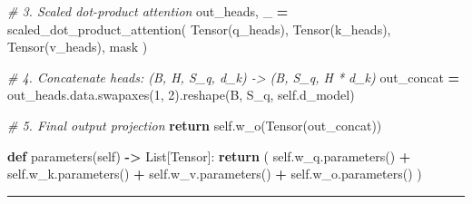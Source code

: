 \documentclass[
  letterpaper,
]{scrbook}
\newenvironment{Shaded}{\begin{snugshade}}{\end{snugshade}}
\newcommand{\CommentTok}[1]{\textcolor[rgb]{0.56,0.35,0.01}{\textit{#1}}}
\newcommand{\ControlFlowTok}[1]{\textcolor[rgb]{0.13,0.29,0.53}{\textbf{#1}}}
\newcommand{\DecValTok}[1]{\textcolor[rgb]{0.00,0.00,0.81}{#1}}
\newcommand{\KeywordTok}[1]{\textcolor[rgb]{0.13,0.29,0.53}{\textbf{#1}}}
\newcommand{\NormalTok}[1]{#1}
\newcommand{\OperatorTok}[1]{\textcolor[rgb]{0.81,0.36,0.00}{\textbf{#1}}}
\newcommand{\VariableTok}[1]{\textcolor[rgb]{0.00,0.00,0.00}{#1}}
\begin{document}
\begin{Shaded}
\begin{Highlighting}[]
        \CommentTok{\# 3. Scaled dot{-}product attention}
\NormalTok{        out\_heads, \_ }\OperatorTok{=}\NormalTok{ scaled\_dot\_product\_attention(}
\NormalTok{            Tensor(q\_heads), Tensor(k\_heads), Tensor(v\_heads), mask}
\NormalTok{        )}

        \CommentTok{\# 4. Concatenate heads: (B, H, S\_q, d\_k) {-}\textgreater{} (B, S\_q, H * d\_k)}
\NormalTok{        out\_concat }\OperatorTok{=}\NormalTok{ out\_heads.data.swapaxes(}\DecValTok{1}\NormalTok{, }\DecValTok{2}\NormalTok{).reshape(B, S\_q, }\VariableTok{self}\NormalTok{.d\_model)}

        \CommentTok{\# 5. Final output projection}
        \ControlFlowTok{return} \VariableTok{self}\NormalTok{.w\_o(Tensor(out\_concat))}

    \KeywordTok{def}\NormalTok{ parameters(}\VariableTok{self}\NormalTok{) }\OperatorTok{{-}\textgreater{}}\NormalTok{ List[Tensor]:}
        \ControlFlowTok{return}\NormalTok{ (}
            \VariableTok{self}\NormalTok{.w\_q.parameters() }\OperatorTok{+}
            \VariableTok{self}\NormalTok{.w\_k.parameters() }\OperatorTok{+}
            \VariableTok{self}\NormalTok{.w\_v.parameters() }\OperatorTok{+}
            \VariableTok{self}\NormalTok{.w\_o.parameters()}
\NormalTok{        )}
\end{Highlighting}
\end{Shaded}

\begin{center}\rule{0.5\linewidth}{0.5pt}\end{center}
\end{document}
